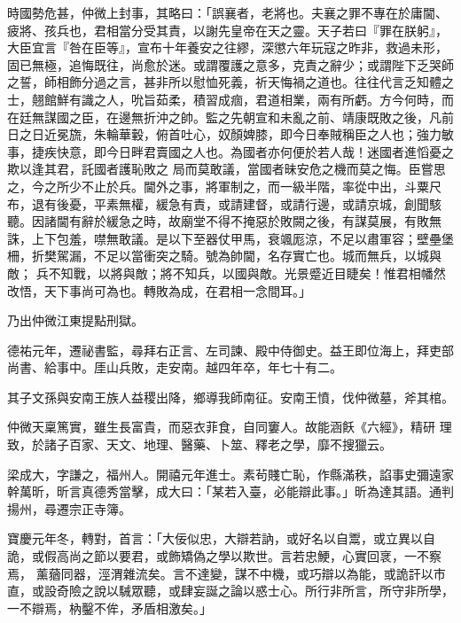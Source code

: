 \begin{pinyinscope}
 時國勢危甚，仲微上封事，其略曰：「誤襄者，老將也。夫襄之罪不專在於庸閫、疲將、孩兵也，君相當分受其責，以謝先皇帝在天之靈。天子若曰『罪在朕躬』，大臣宜言『咎在臣等』，宣布十年養安之往繆，深懲六年玩寇之昨非，救過未形，固已無極，追悔既往，尚愈於迷。或謂覆護之意多，克責之辭少；或謂陛下乏哭師
 之誓，師相飾分過之言，甚非所以慰恤死義，祈天悔禍之道也。往往代言乏知體之士，翹館鮮有識之人，吮旨茹柔，積習成痼，君道相業，兩有所虧。方今何時，而在廷無謀國之臣，在邊無折沖之帥。監之先朝宣和未亂之前、靖康既敗之後，凡前日之日近冕旒，朱輪華轂，俯首吐心，奴顏婢膝，即今日奉賊稱臣之人也；強力敏事，捷疾快意，即今日畔君賣國之人也。為國者亦何便於若人哉！迷國者進慆憂之欺以逢其君，託國者護恥敗之
 局而莫敢議，當國者昧安危之機而莫之悔。臣嘗思之，今之所少不止於兵。閫外之事，將軍制之，而一級半階，率從中出，斗粟尺布，退有後憂，平素無權，緩急有責，或請建督，或請行邊，或請京城，創聞駭聽。因諸閫有辭於緩急之時，故廟堂不得不掩惡於敗闕之後，有謀莫展，有敗無誅，上下包羞，噤無敢議。是以下至器仗甲馬，衰颯厖涼，不足以肅軍容；壁壘堡柵，折樊駕漏，不足以當衝突之騎。號為帥閫，名存實亡也。城而無兵，以城與敵；
 兵不知戰，以將與敵；將不知兵，以國與敵。光景蹙近目睫矣！惟君相幡然改悟，天下事尚可為也。轉敗為成，在君相一念間耳。」



 乃出仲微江東提點刑獄。



 德祐元年，遷祕書監，尋拜右正言、左司諫、殿中侍御史。益王即位海上，拜吏部尚書、給事中。厓山兵敗，走安南。越四年卒，年七十有二。



 其子文孫與安南王族人益稷出降，鄉導我師南征。安南王憤，伐仲微墓，斧其棺。



 仲微天稟篤實，雖生長富貴，而惡衣菲食，自同窶人。故能涵飫《六經》，精研
 理致，於諸子百家、天文、地理、醫藥、卜筮、釋老之學，靡不搜獵云。



 梁成大，字謙之，福州人。開禧元年進士。素茍賤亡恥，作縣滿秩，諂事史彌遠家幹萬昕，昕言真德秀當擊，成大曰：「某若入臺，必能辯此事。」昕為達其語。通判揚州，尋遷宗正寺簿。



 寶慶元年冬，轉對，首言：「大佞似忠，大辯若訥，或好名以自鬻，或立異以自詭，或假高尚之節以要君，或飾矯偽之學以欺世。言若忠鯁，心實回衺，一不察焉，
 薰蕕同器，涇渭雜流矣。言不達變，謀不中機，或巧辯以為能，或詭訐以市直，或設奇險之說以駴眾聽，或肆妄誕之論以惑士心。所行非所言，所守非所學，一不辯焉，枘鑿不侔，矛盾相激矣。」




\end{pinyinscope}

